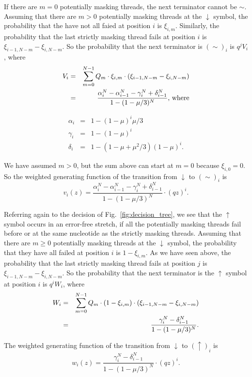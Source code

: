 \documentclass{article}
\begin{document}
If there are $m = 0$ potentially masking threads, the next terminator
cannot be $\sim$. Assuming that there are $m > 0$ potentially masking
threads at the $\downarrow$ symbol, the probability that the have not all
faied at position $i$ is $\xi_{i,m}$. Similarly, the probability that the
last strictly masking thread fails at position $i$ is
$\xi_{i-1,N-m}-\xi_{i,N-m}$. So the probability that the next terminator
is $(\sim)_i$ is $q^j V_i$, where
\begin{eqnarray}
\label{eq:Si}
V_i &=& \sum_{m=0}^{N-1} Q_m \cdot \xi_{i,m} \cdot
  (\xi_{i-1,N-m}-\xi_{i,N-m}) \notag \\
  &=& \frac{\alpha_i^N-\alpha_{i-1}^N-\gamma_i^N+\delta_{i-1}^N}
{1-(1-\mu/3)^N} \text{, where}
\end{eqnarray}

\begin{eqnarray}
\alpha_i &=& 1-(1-\mu)^i\mu/3 \\
\gamma_i &=& 1-(1-\mu)^i \\
\delta_i &=& 1-(1-\mu+\mu^2/3)(1-\mu)^i.
\end{eqnarray}

We have assumed $m>0$, but the sum above can start at $m=0$ because
$\xi_{i,0}=0$. So the weighted generating function of the transition from
$\downarrow$ to $(\sim)_i$ is
\begin{equation}
v_i(z) = \frac{\alpha_i^N-\alpha_{i-1}^N-
  \gamma_i^N+\delta_{i-1}^N}{1-(1-\mu/3)^N} \cdot (qz)^i.
\end{equation}

Referring again to the decision of Fig.~\ref{fig:decision_tree}, we see
that the $\uparrow$ symbol occurs in an error-free stretch, if all the
potentially masking threads fail before or at the same nucleotide as the
strictly masking threads. Assuming that there are $m \geq 0$ potentially
masking threads at the $\downarrow$ symbol, the probability that they have
all failed at position $i$ is $1-\xi_{i,m}$. As we have seen above, the
probability that the last strictly masking thread fails at position $j$ is
$\xi_{i-1,N-m}-\xi_{i,N-m}$. So the probability that the next terminator
is the $\uparrow$ symbol at position $i$ is $q^i W_i$, where
\begin{eqnarray}
  W_i &=& \sum_{m=0}^{N-1} Q_m \cdot (1-\xi_{i,m}) \cdot
  (\xi_{i-1,N-m}-\xi_{i,N-m}) \notag \\
    &=& \frac{\gamma_i^N-\delta_{i-1}^N}{1-(1-\mu/3)^N}.
\end{eqnarray}

The weighted generating function of the transition from $\downarrow$ to
$(\uparrow)_i$ is
\begin{equation}
w_i(z) = \frac{\gamma_i^N- \delta_{i-1}^N}{1-(1-\mu/3)^N} \cdot (qz)^i.
\end{equation}
\end{document}
